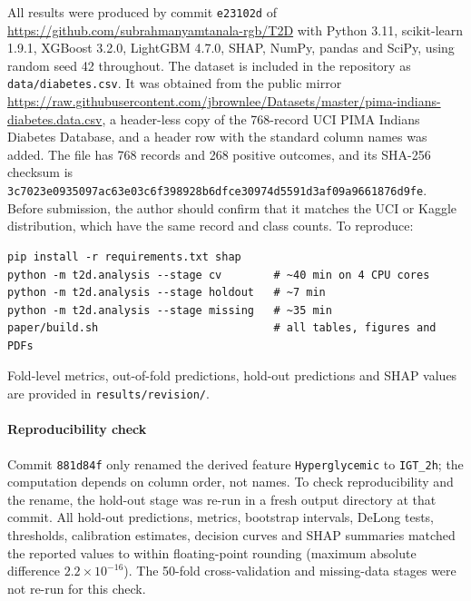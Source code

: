 \documentclass[11pt]{article}
\begin{document}
All results were produced by commit \texttt{e23102d} of \url{https://github.com/subrahmanyamtanala-rgb/T2D} with Python 3.11, scikit-learn 1.9.1, XGBoost 3.2.0, LightGBM 4.7.0, SHAP, NumPy, pandas and SciPy, using random seed 42 throughout. The dataset is included in the repository as \texttt{data/diabetes.csv}. It was obtained from the public mirror \url{https://raw.githubusercontent.com/jbrownlee/Datasets/master/pima-indians-diabetes.data.csv}, a header-less copy of the 768-record UCI PIMA Indians Diabetes Database, and a header row with the standard column names was added. The file has 768 records and 268 positive outcomes, and its SHA-256 checksum is \texttt{3c7023e0935097ac63e03c6f398928b6dfce30974d5591d3af09a9661876d9fe}. Before submission, the author should confirm that it matches the UCI or Kaggle distribution, which have the same record and class counts. To reproduce:

\begin{verbatim}
pip install -r requirements.txt shap
python -m t2d.analysis --stage cv        # ~40 min on 4 CPU cores
python -m t2d.analysis --stage holdout   # ~7 min
python -m t2d.analysis --stage missing   # ~35 min
paper/build.sh                           # all tables, figures and PDFs
\end{verbatim}

Fold-level metrics, out-of-fold predictions, hold-out predictions and SHAP values are provided in \texttt{results/revision/}.

\paragraph{Reproducibility check} Commit \texttt{881d84f} only renamed the derived feature \texttt{Hyperglycemic} to \texttt{IGT\_2h}; the computation depends on column order, not names. To check reproducibility and the rename, the hold-out stage was re-run in a fresh output directory at that commit. All hold-out predictions, metrics, bootstrap intervals, DeLong tests, thresholds, calibration estimates, decision curves and SHAP summaries matched the reported values to within floating-point rounding (maximum absolute difference $2.2\times10^{-16}$). The 50-fold cross-validation and missing-data stages were not re-run for this check.
\end{document}
